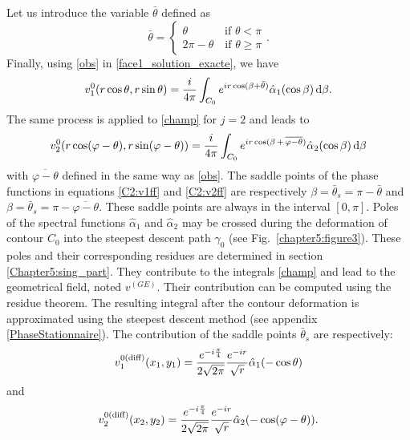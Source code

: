 Let us introduce the variable $\bar{\theta}$ defined as
\begin{equation}
\label{obs}
\bar{\theta} =
\begin{cases}
\theta \qquad \quad \; \text{if } \theta < \pi \\ 
2\pi - \theta \quad \text{if } \theta \geq \pi 
\end{cases}.
\end{equation}
Finally, using \eqref{obs} in \eqref{face1_solution_exacte}, we have
\begin{equation}
v_1^0(r \cos \theta,r \sin \theta) = \dfrac{i}{4 \pi} \int_{C_0}  e^{i r \cos ( \beta + \bar{\theta})} \hat{\alpha}_1(\cos \beta)  \, {\rm d}\beta.
\label{C2:v1ff}
\end{equation}
The same process is applied to \eqref{champ} for $j=2$ and leads to
\begin{equation}
v_2^0(r \cos (\varphi - \theta),r \sin (\varphi - \theta)) = \dfrac{i}{4 \pi} \int_{C_0}  e^{i r \cos ( \beta \, + \, \overline{\varphi - \theta})}  \hat{\alpha}_2( \cos \beta) \, {\rm d}\beta
\label{C2:v2ff}
\end{equation}
with $\overline{\varphi - \theta}$ defined in the same way as \eqref{obs}. The saddle points of the phase functions in equations \eqref{C2:v1ff} and \eqref{C2:v2ff} are respectively $\beta = \bar{\theta}_s = \pi - \bar{\theta} $ and $\beta = \bar{\theta}_s = \pi - \overline{\varphi-\theta}$. These saddle points are always in the interval $[0,\pi]$. Poles of the spectral functions $\hat{\alpha}_1$ and $\hat{\alpha}_2$ may be crossed during the deformation of contour $C_0$ into the steepest descent path $\gamma_0$ (see Fig.~\ref{chapter5:figure3}). These poles and their corresponding residues are determined in section \ref{Chapter5:sing_part}. They contribute to the integrals \eqref{champ} and lead to the geometrical field, noted $v^{(GE)}$. Their contribution can be computed using the residue theorem. The resulting integral after the contour deformation is approximated using the steepest descent method (see appendix \ref{PhaseStationnaire}). The contribution of the saddle points $  \bar{\theta}_s $ are respectively:
\begin{equation}
\label{diffracted_field1}
v_1^{0 \rm (diff)}(x_1,y_1) = \dfrac{e^{-i\frac{\pi}{4}}}{2\sqrt{2\pi}}\dfrac{e^{-ir}}{\sqrt{r}} \hat{\alpha}_1( - \cos \theta)   
\end{equation}
and
\begin{equation}
\label{diffracted_field2}
v_2^{0 \rm (diff)}(x_2,y_2) = \dfrac{e^{-i\frac{\pi}{4}}}{2\sqrt{2\pi}} \dfrac{e^{-ir}}{\sqrt{r}} \hat{\alpha}_2( - \cos ( \varphi - \theta)).   
\end{equation}
